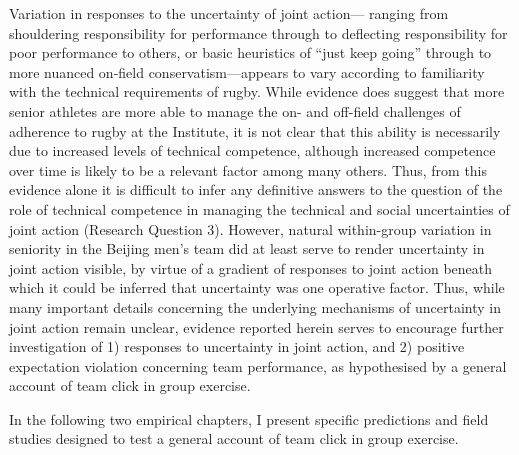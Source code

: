 \begin{CJK}{UTF8}{gbsn}
Variation in responses to the uncertainty of joint action--- ranging from shouldering responsibility for performance through to deflecting responsibility for poor performance to others, or basic heuristics of ``just keep going'' through to more nuanced on-field conservatism---appears to vary according to familiarity with the technical requirements of rugby.  While evidence does suggest that more senior athletes are more able to manage the on- and off-field challenges of adherence to rugby at the Institute, it is not clear that this ability is necessarily due to increased levels of technical competence, although increased competence over time is likely to be a relevant factor among many others.  Thus, from this evidence alone it is difficult to infer any definitive answers to the question of the role of technical competence in managing the technical and social uncertainties of joint action (Research Question 3).  However, natural within-group variation in seniority in the Beijing men's team did at least serve to render uncertainty in joint action visible, by virtue of a gradient of responses to joint action beneath which it could be inferred that uncertainty was one operative factor.  Thus, while many important details concerning the underlying mechanisms of uncertainty in joint action remain unclear, evidence reported herein serves to encourage further investigation of 1) responses to uncertainty in joint action, and 2) positive expectation violation concerning team performance, as hypothesised by a general account of team click in group exercise.

In the following two empirical chapters, I present specific predictions and field studies designed to test a general account of team click in group exercise.
















                                        \end{CJK}
